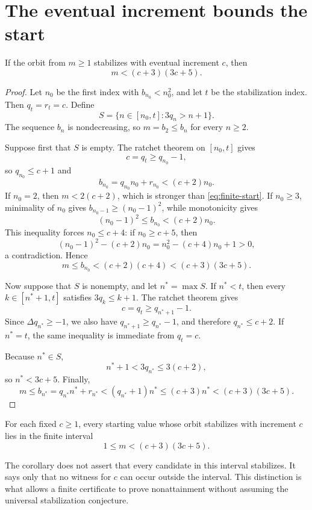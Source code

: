 \section{The eventual increment bounds the start}

\begin{theorem}
\label{thm:finite-start}
If the orbit from $m\ge1$ stabilizes with eventual increment $c$, then
\begin{equation}
 \boxed{m<(c+3)(3c+5).}
 \label{eq:finite-start}
\end{equation}
\end{theorem}

\begin{proof}
Let $n_0$ be the first index with $b_{n_0}<n_0^2$, and let $t$ be the stabilization index. Then $q_t=r_t=c$. Define
\[
 S=\{n\in[n_0,t]:3q_n>n+1\}.
\]
The sequence $b_n$ is nondecreasing, so $m=b_2\le b_n$ for every $n\ge2$.

Suppose first that $S$ is empty. The ratchet theorem on $[n_0,t]$ gives
\[
 c=q_t\ge q_{n_0}-1,
\]
so $q_{n_0}\le c+1$ and
\[
 b_{n_0}=q_{n_0}n_0+r_{n_0}<(c+2)n_0.
\]
If $n_0=2$, then $m<2(c+2)$, which is stronger than \eqref{eq:finite-start}. If $n_0\ge3$, minimality of $n_0$ gives $b_{n_0-1}\ge(n_0-1)^2$, while monotonicity gives
\[
 (n_0-1)^2\le b_{n_0}<(c+2)n_0.
\]
This inequality forces $n_0\le c+4$: if $n_0\ge c+5$, then
\[
 (n_0-1)^2-(c+2)n_0
 =n_0^2-(c+4)n_0+1>0,
\]
a contradiction. Hence
\[
 m\le b_{n_0}<(c+2)(c+4)<(c+3)(3c+5).
\]

Now suppose that $S$ is nonempty, and let $n^*=\max S$. If $n^*<t$, then every $k\in[n^*+1,t]$ satisfies $3q_k\le k+1$. The ratchet theorem gives
\[
 c=q_t\ge q_{n^*+1}-1.
\]
Since $\Delta q_{n^*}\ge-1$, we also have $q_{n^*+1}\ge q_{n^*}-1$, and therefore $q_{n^*}\le c+2$. If $n^*=t$, the same inequality is immediate from $q_t=c$.

Because $n^*\in S$,
\[
 n^*+1<3q_{n^*}\le3(c+2),
\]
so $n^*<3c+5$. Finally,
\[
 m\le b_{n^*}=q_{n^*}n^*+r_{n^*}
  <(q_{n^*}+1)n^*
  \le(c+3)n^*
  <(c+3)(3c+5).
\]
\end{proof}

\begin{corollary}
For each fixed $c\ge1$, every starting value whose orbit stabilizes with increment $c$ lies in the finite interval
\[
 1\le m<(c+3)(3c+5).
\]
\end{corollary}

\begin{remark}
The corollary does not assert that every candidate in this interval stabilizes. It says only that no witness for $c$ can occur outside the interval. This distinction is what allows a finite certificate to prove nonattainment without assuming the universal stabilization conjecture.
\end{remark}
